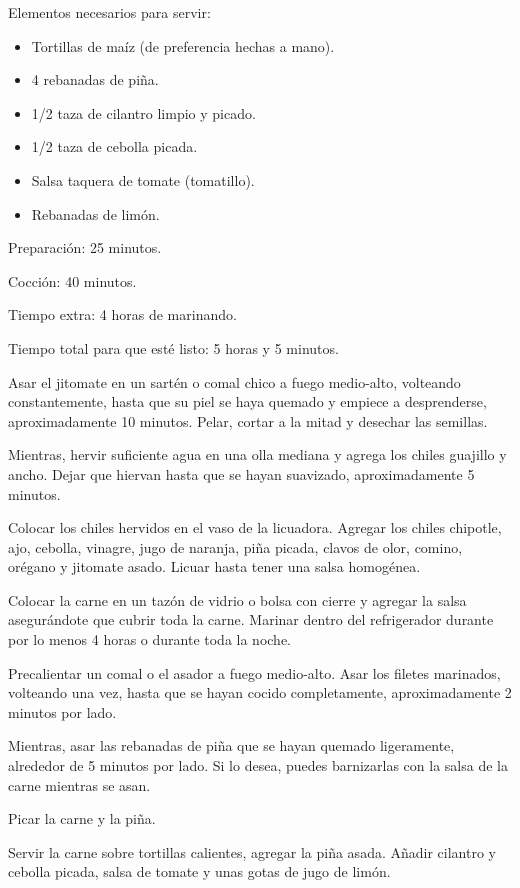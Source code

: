 \documentclass[12pt,twoside,openright,a5paper]{book}
\begin{document}
Elementos necesarios para servir:

\begin{itemize} \item Tortillas de maíz (de preferencia hechas a mano).
\item 4 rebanadas de piña.  \item 1/2 taza de cilantro limpio y picado.
\item 1/2 taza de cebolla picada.  \item Salsa taquera de tomate (tomatillo).
\item Rebanadas de limón.  \end{itemize}

Preparación: 25 minutos.

Cocción: 40 minutos.

Tiempo extra: 4 horas de marinando.

Tiempo total para que esté listo: 5 horas y 5 minutos.

Asar el jitomate en un sartén o comal chico a fuego medio-alto, volteando
constantemente, hasta que su piel se haya quemado y empiece a desprenderse,
aproximadamente 10 minutos. Pelar, cortar a la mitad y desechar las semillas.

Mientras, hervir suficiente agua en una olla mediana y agrega los
chiles guajillo y ancho. Dejar que hiervan hasta que se hayan suavizado,
aproximadamente 5 minutos.

Colocar los chiles hervidos en el vaso de la licuadora. Agregar los
chiles chipotle, ajo, cebolla, vinagre, jugo de naranja, piña picada,
clavos de olor, comino, orégano y jitomate asado. Licuar hasta tener una
salsa homogénea.

Colocar la carne en un tazón de vidrio o bolsa con cierre y agregar la
salsa asegurándote que cubrir toda la carne. Marinar dentro del refrigerador
durante por lo menos 4 horas o durante toda la noche.

Precalientar un comal o el asador a fuego medio-alto. Asar los filetes
marinados, volteando una vez, hasta que se hayan cocido completamente,
aproximadamente 2 minutos por lado.

Mientras, asar las rebanadas de piña que se hayan quemado ligeramente,
alrededor de 5 minutos por lado. Si lo desea, puedes barnizarlas con la
salsa de la carne mientras se asan.

Picar la carne y la piña.

Servir la carne sobre tortillas calientes, agregar la piña asada. Añadir
cilantro y cebolla picada, salsa de tomate y unas gotas de jugo de limón.
\end{document}
